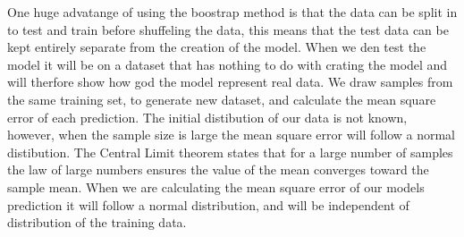 One huge advatange of using the boostrap method is that the data can be split in to 
test and train before shuffeling the data, this means that the test data can be kept 
entirely separate from the creation of the model. When we den test the model it will
be on a dataset that has nothing to do with crating the model and will therfore show
how god the model represent real data. We draw samples from the same training set, to 
generate new dataset, and calculate the mean square error of each prediction. The initial 
distibution of our data is not known, however, when the sample size is large the mean 
square error will follow a normal distibution. The Central Limit theorem \cite{JAY2021CLT} states that for a 
large number of samples the law of large numbers \cite{JAY2021LLN} ensures the value of the mean converges toward the sample mean. 
When we are calculating the mean square error of our models prediction it will follow a 
normal distribution, and will be independent of distribution of the training data.


